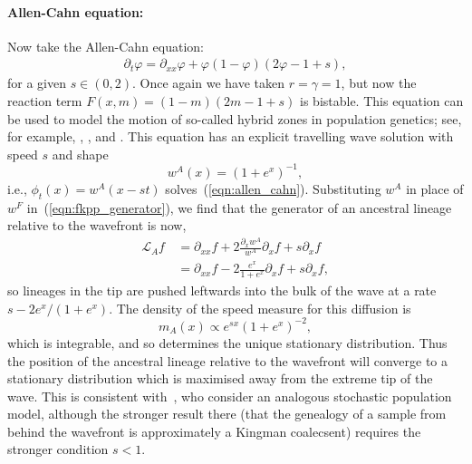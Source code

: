 \documentclass[12pt]{article}
\newcommand{\Lgen}{\mathcal{L}}    %
\numberwithin{equation}{section}
\begin{document}
\paragraph{Allen-Cahn equation:}
Now take the Allen-Cahn equation:
\begin{align} \label{eqn:allen_cahn}
    \partial_t\varphi = \partial_{xx}\varphi + \varphi(1-\varphi)(2\varphi-1+s),
\end{align}
for a given $s \in (0,2)$.
Once again we have taken $r=\gamma=1$, but now the reaction term
$F(x,m) = (1-m) (2m-1+s)$ is bistable.
This equation can be used to model the motion of so-called 
hybrid zones in population genetics; see, for example,
\citet{barton:1979}, \citet{gooding:2018}, and \citet{etheridge/gooding/letter:2022}.
This equation has an explicit travelling wave solution with speed $s$
and shape
\[ w^A(x) = (1+e^{x})^{-1} , \]
i.e., $\phi_t(x)=w^A(x-st)$ solves~(\ref{eqn:allen_cahn}).
Substituting $w^A$ in place of $w^F$ in~(\ref{eqn:fkpp_generator}),
we find that the generator of an ancestral lineage relative to the wavefront is now, 
\begin{align*}
\Lgen_A f
    &=
    \partial_{xx}f
    + 
    2 \frac{\partial_xw^A}{w^A} \partial_xf
    +
    s \partial_x f\\
    \qquad &=
    \partial_{xx}f
    -
    2 \frac{e^x}{1+e^x} \partial_xf 
    + 
    s \partial_xf,
\end{align*}
so lineages in the tip are pushed leftwards into the bulk of the 
wave at a rate $s-2e^x/(1+e^{x})$.
The density of the speed measure for this diffusion is
$$
    m_A(x) \propto e^{sx}(1+e^x)^{-2},
$$
which is integrable, and so determines the unique stationary distribution.
Thus the position of the ancestral lineage relative to the wavefront will converge to a stationary 
distribution which is maximised away from the extreme tip of the wave.
This is consistent with~\cite{etheridge/penington:2022}, who consider an analogous
stochastic population model, although the stronger result there (that the genealogy
of a sample from behind the wavefront is approximately a Kingman coalecsent) requires
the stronger condition $s<1$.

\end{document}
